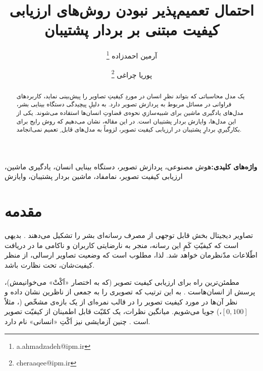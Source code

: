 \documentclass[twocolumn]{article}
\newcommand{\mykeyword}[1]{\par\textbf{واژه‌های کلیدی:}{#1}}
\begin{document}
\title{احتمال تعمیم‌پذیر نبودن روش‌های ارزیابی کیفیت مبتنی بر بردار پشتیبان}

\author{آرمین احمدزاده \thanks{a.ahmadzadeh@ipm.ir}}
\author{پوریا چراغی \thanks{cheraaqee@ipm.ir}}
\date{}

\maketitle
\begin{abstract}
	یک مدل محاسباتی که بتواند نظرِ انسان در موردِ کیفیتِ تصاویر را پیش‌بینی نماید، کاربردهای فراوانی در مسائل مربوط به پردازش تصویر دارد. به دلیلِ پیچیدگی دستگاه بینایی بشر، مدل‌های یادگیری ماشین برای شبیه‌سازیِ نحوه‌ی قضاوتِ انسان‌ها استفاده می‌شوند. یکی از این مدل‌ها، وایازش بردار پشتیبان است. در این مقاله، نشان می‌دهیم که روش رایج برای بکارگیریِ بردارِ پشتیبان در ارزیابی کیفیت تصویر، لزوماً به مدل‌های قابل ِ تعمیم نمی‌انجامد.
\end{abstract}
\mykeyword{هوش مصنوعی، پردازش تصویر، دستگاه بینایی انسان، یادگیری ماشین، ارزیابی کیفیت تصویر، نمامفاد، ماشین بردار پشتیبان، وایازش }




\section{مقدمه}
\label{sec:intro}
تصاویر دیجیتال بخش قابل توجهی از مصرف رسانه‌ای بشر را تشکیل می‌دهند \cite{cisco}. بدیهی است که کیفیّتِ کَمِ این رسانه، منجر به نارضایتی کاربران و ناکامی ما در دریافت اطّلاعات مدّنظرمان خواهد شد. لذا، مطلوب است که وضعیت تصاویر ارسالی، از منظر کیفیت‌شان، تحت نظارت باشد.

مطمئن‌ترین راه برای ارزیابی کیفیت تصویر (که به اختصار «اَکْتْ» می‌خوانیمش)، پرسش از انسان‌هاست \cite{allen2012manual}. به این ترتیب که تصویری را به جمعی از ناظرین نشان داده و نظر آن‌ها در مورد کیفیت تصویر را در قالب نمره‌ای از یک بازه‌ی مشخّص (، مثلاً $[0, 100]$،) جویا می‌شویم. میانگین نظرات، یک کمّیّت قابل اطمینان از کیفیّت تصویر است \cite{mohammadi2014subjective}. چنین آزمایشی نیز اَکْتِ «انسانی» نام دارد.
\end{document}

